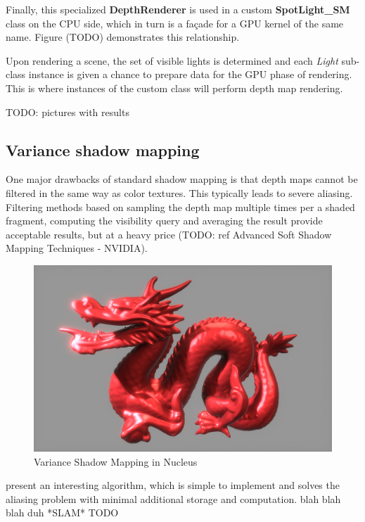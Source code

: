 Finally, this specialized \textbf{DepthRenderer} is used in a custom \textbf{SpotLight\_SM} class on the CPU side, which in turn is a façade for a GPU kernel of the same name. Figure (TODO) demonstrates this relationship.

Upon rendering a scene, the set of visible lights is determined and each \emph{Light} sub-class instance is given a chance to prepare data for the GPU phase of rendering. This is where instances of the custom class will perform depth map rendering.

TODO: pictures with results

\subsection{Variance shadow mapping}

One major drawbacks of standard shadow mapping is that depth maps cannot be filtered in the same way as color textures. This typically leads to severe aliasing. Filtering methods based on sampling the depth map multiple times per a shaded fragment, computing the visibility query and averaging the result provide acceptable results, but at a heavy price (TODO: ref Advanced Soft Shadow Mapping Techniques - NVIDIA).

\begin{figure}[h!]
  \centering
    \includegraphics[width=0.9\linewidth]{./Figures/shadowMapping/canHazDragon.jpg}
    \caption[VSM in Nucleus]{Variance Shadow Mapping in Nucleus}
  \label{fig:NucleusVSM}
\end{figure}

\citet{Donnelly06varianceshadow} present an interesting algorithm, which is simple to implement and solves the aliasing problem with minimal additional storage and computation. blah blah blah duh *SLAM* TODO

